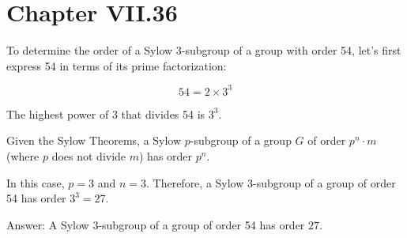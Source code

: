 \documentclass[12pt]{amsart}
\theoremstyle{definition}
\numberwithin{equation}{section}
\theoremstyle{plain}
\begin{document}
\section*{Chapter VII.36}
\begin{exercise}{2}
To determine the order of a Sylow 3-subgroup of a group with order 54, let's first express 54 in terms of its prime factorization:

\[ 54 = 2 \times 3^3 \]

The highest power of 3 that divides 54 is \(3^3\).

Given the Sylow Theorems, a Sylow \( p \)-subgroup of a group \( G \) of order \( p^n \cdot m \) (where \( p \) does not divide \( m \)) has order \( p^n \).

In this case, \( p = 3 \) and \( n = 3 \). Therefore, a Sylow 3-subgroup of a group of order 54 has order \( 3^3 = 27 \).

Answer: A Sylow 3-subgroup of a group of order 54 has order \( \boxed{27} \).
\end{exercise}
\vspace*{20pt}
\end{document}
